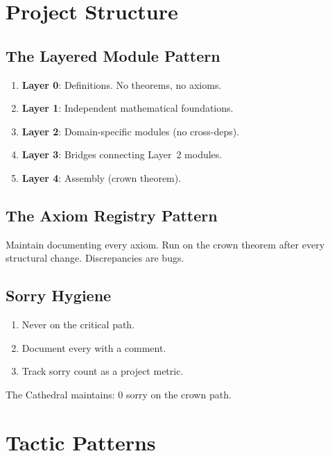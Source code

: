 \documentclass[11pt,a4paper]{article}
\begin{document}
\section{Project Structure}
\label{sec:structure}

\subsection{The Layered Module Pattern}

\begin{enumerate}
  \item \textbf{Layer 0}: Definitions. No theorems, no axioms.
  \item \textbf{Layer 1}: Independent mathematical foundations.
  \item \textbf{Layer 2}: Domain-specific modules (no cross-deps).
  \item \textbf{Layer 3}: Bridges connecting Layer~2 modules.
  \item \textbf{Layer 4}: Assembly (crown theorem).
\end{enumerate}

\subsection{The Axiom Registry Pattern}

Maintain  documenting every axiom. Run
 on the crown theorem after every structural
change. Discrepancies are bugs.

\subsection{Sorry Hygiene}

\begin{enumerate}
  \item Never  on the critical path.
  \item Document every  with a comment.
  \item Track sorry count as a project metric.
\end{enumerate}

The Cathedral maintains: 0 sorry on the crown path.

\section{Tactic Patterns}
\label{sec:tactics}
\end{document}
